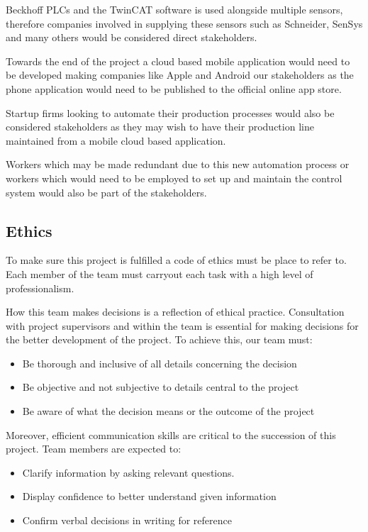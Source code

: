 \documentclass[a4paper, 10pt, conference]{IEEEconf}
\begin{document}
Beckhoff PLCs and the TwinCAT software is used alongside multiple sensors, therefore companies involved in supplying these sensors such as Schneider, SenSys and many others would be considered direct stakeholders. 

Towards the end of the project a cloud based mobile application would need to be developed making companies like Apple and Android our stakeholders as the phone application would need to be published to the official online app store.

Startup firms looking to automate their production processes would also be considered stakeholders as they may wish to have their production line maintained from a mobile cloud based application.

Workers which may be made redundant due to this new automation process or workers which would need to be employed to set up and maintain the control system would also be part of the stakeholders.

\subsection{Ethics}

To make sure this project is fulfilled a code of ethics must be place to refer to. Each member of the team must carryout each task with a high level of professionalism. 

How this team makes decisions is a reflection of ethical practice. Consultation with project supervisors and within the team is essential for making decisions for the better development of the project. To achieve this, our team must:

\begin{itemize}
	\item Be thorough and inclusive of all details concerning the decision 
	\item Be objective and not subjective to details central to the project
	\item Be aware of what the decision means or the outcome of the project
\end{itemize}	

Moreover, efficient communication skills are critical to the succession of this project. Team members are expected to:

\begin{itemize}
	\item Clarify information by asking relevant questions.  
	\item Display confidence to better understand given information
	\item Confirm verbal decisions in writing for reference
\end{itemize}	
\end{document}
